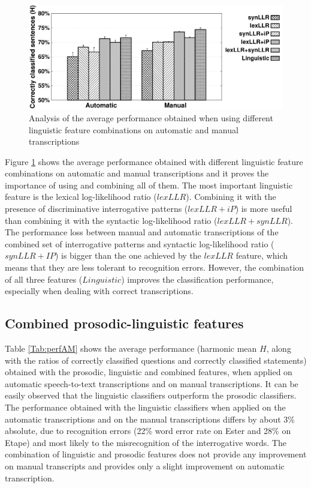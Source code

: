\documentclass[runningheads,a4paper]{llncs}
\begin{document}
\begin{figure}
\begin{center}
\includegraphics[scale=0.5]{Image/averageStats_compareLinguisticFeatures_withSD.pdf}
\end{center}
\caption{Analysis of the average performance obtained when using different linguistic feature combinations on automatic and manual transcriptions}
\label{Fig:L}
\end{figure}


Figure \ref{Fig:L} shows the average performance obtained with different linguistic feature combinations on automatic and manual transcriptions and it proves the importance of using and combining all of them.
The most important linguistic feature is the lexical log-likelihood ratio ($lexLLR$).
Combining it with the presence of discriminative interrogative patterns ($lexLLR+iP$) is more useful than combining it with the syntactic log-likelihood ratio ($lexLLR+synLLR$).
The performance loss between manual and automatic transcriptions of the combined set of interrogative patterns and syntactic log-likelihood ratio ($synLLR+IP$) is bigger than the one achieved by the $lexLLR$ feature, which means that they are less tolerant to recognition errors.
However, the combination of all three features ($Linguistic$) improves the classification performance, especially when dealing with correct transcriptions.


\subsection{Combined prosodic-linguistic features}

Table \ref{Tab:perfAM} shows the average performance (harmonic mean $H$, along with the ratios of correctly classified questions and  correctly classified statements) obtained with the prosodic, linguistic and combined features, when applied on automatic speech-to-text transcriptions and on manual transcriptions.
It can be easily observed that the linguistic classifiers outperform the prosodic classifiers.
The performance obtained with the linguistic classifiers when applied on the automatic transcriptions and on the manual transcriptions differs by about 3\% absolute, due to recognition errors (22\% word error rate on Ester and 28\% on Etape) and most likely to the misrecognition of the interrogative words.
The combination of linguistic and prosodic features does not provide any improvement on manual transcripts and provides only a slight improvement on automatic transcription.
\end{document}
